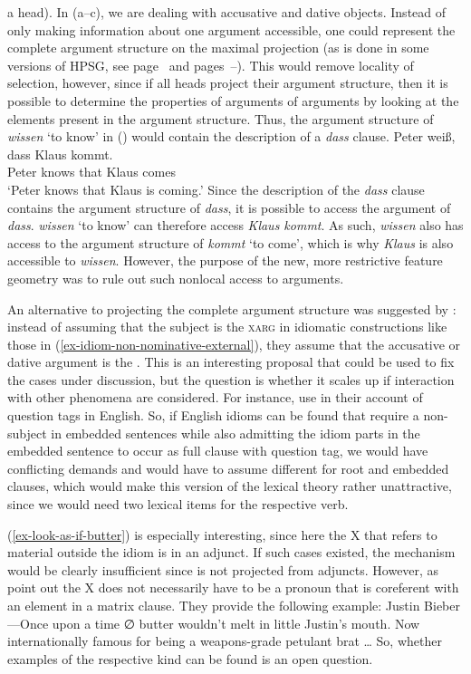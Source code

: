 a head). In (a--c), we are dealing with accusative and dative objects. Instead of only making information about one argument accessible,
one could represent the complete argument structure on the maximal projection (as is done in some
versions of HPSG, see page~\pageref{Seite-Bender-Wambaya} and pages~\pageref{page-Bender-Wambaya-two}--\pageref{page-non-cancellation-end}). This would remove locality of selection, however,
since if all heads project their argument structure, then it is possible to determine the properties of arguments of arguments by looking at the elements
present in the argument structure. Thus, the argument structure of \emph{wissen} `to know' in ()
would contain the description of a \emph{dass} clause.
\ea
\gll Peter weiß, dass Klaus kommt.\\
	 Peter knows that Klaus comes\\
\glt `Peter knows that Klaus is coming.'
\z
Since the description of the \emph{dass} clause contains the argument structure of \emph{dass}, it is possible to access the argument of \emph{dass}.
\emph{wissen} `to know' can therefore access \emph{Klaus kommt}. As such, \emph{wissen}  also has access to the argument structure
of \emph{kommt} `to come', which is why \emph{Klaus} is also accessible to \emph{wissen}. However,
the purpose of the new, more restrictive feature geometry was to rule out such nonlocal access to
arguments. 

An alternative to projecting the complete argument structure was suggested by
\citet[Section~6]{KSF2015a}: instead of assuming that the subject is the \textsc{xarg} in idiomatic
constructions like those in (\ref{ex-idiom-non-nominative-external}), they assume that the
accusative or dative argument is the \xarg. This is an interesting proposal that could be used to
fix the cases under discussion, but the question is whether it scales up if interaction with other
phenomena are considered. For instance, \citet{BF99a} use \xarg in their account of question tags in
English. So, if English idioms can be found that require a non-subject \xarg in embedded
sentences while also admitting the idiom parts in the embedded sentence to occur as full clause with
question tag, we would have conflicting demands and would have to assume different \xargs for root
and embedded clauses, which would make this version of the lexical theory rather unattractive, since
we would need two lexical items for the respective verb.

\largerpage
(\ref{ex-look-as-if-butter}) is especially interesting, since here the X that refers to material
outside the idiom is in an adjunct. If such cases existed, the \xarg mechanism would be clearly
insufficient since \xarg is not projected from adjuncts. However, as \citet{KSF2015a} point out the
X does not necessarily have to be a pronoun that is coreferent with an element in a matrix
clause. They provide the following example:
\ea
Justin Bieber—Once upon a time ∅ butter wouldn't melt in little Justin's mouth. Now internationally
famous for being a weapons-grade petulant brat \ldots
\z
So, whether examples of the respective kind can be found is an open question.

